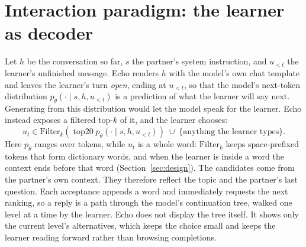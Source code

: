 \documentclass[11pt,a4paper]{article}
\begin{document}
\section{Interaction paradigm: the learner as decoder}
\label{sec:paradigm}
Let $h$ be the conversation so far, $s$ the partner's system instruction, and $u_{<t}$ the learner's unfinished message. Echo renders $h$ with the model's own chat template and leaves the learner's turn \emph{open}, ending at $u_{<t}$, so that the model's next-token distribution $p_\theta(\cdot\mid s,h,u_{<t})$ is a prediction of what the learner will say next. Generating from this distribution would let the model speak for the learner. Echo instead exposes a filtered top-$k$ of it, and the learner chooses:
\begin{equation}
 u_t \in \mathrm{Filter}_k\!\left(\operatorname{top20} p_\theta(\cdot\mid s,h,u_{<t})\right)\;\cup\;\{\text{anything the learner types}\}.
\end{equation}
Here $p_\theta$ ranges over tokens, while $u_t$ is a whole word: $\mathrm{Filter}_k$ keeps space-prefixed tokens that form dictionary words, and when the learner is inside a word the context ends before that word (Section~\ref{sec:design}). The candidates come from the partner's own context. They therefore reflect the topic and the partner's last question. Each acceptance appends a word and immediately requests the next ranking, so a reply is a path through the model's continuation tree, walked one level at a time by the learner. Echo does not display the tree itself. It shows only the current level's alternatives, which keeps the choice small and keeps the learner reading forward rather than browsing completions.
\end{document}
